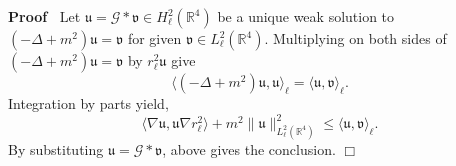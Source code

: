 \documentclass{article}
\newenvironment{proof}{\noindent\textbf{Proof\ }}{\hspace*{\fill}$\Box$\medskip}
\begin{document}
\begin{proof}
  Let $\mathfrak{u}=\mathcal{G} \ast \mathfrak{v} \in H_{\ell}^2
  (\mathbb{R}^4)$ be a unique weak solution to $(- \Delta + m^2)
  \mathfrak{u}=\mathfrak{v}$ for given $\mathfrak{v} \in L_{\ell}^2
  (\mathbb{R}^4)$.
  Multiplying on both sides of $(- \Delta + m^2) \mathfrak{u}=\mathfrak{v}$ by   $r_{\ell}^2 \mathfrak{u}$ give
  \begin{equation}
      \langle (- \Delta + m^2) \mathfrak{u}, \mathfrak{u} \rangle_{\ell} = \langle \mathfrak{u}, \mathfrak{v} \rangle_{\ell} .
  \end{equation}
  Integration by parts yield,
  \[ \langle \nabla \mathfrak{u}, \mathfrak{u} \nabla r_{\ell}^2 \rangle +
     m^2 \| \mathfrak{u} \|_{L^2_{\ell} (\mathbb{R}^4)}^2 \leqslant \langle
     \mathfrak{u}, \mathfrak{v} \rangle_{\ell} . \]
  By substituting $\mathfrak{u}=\mathcal{G} \ast \mathfrak{v}$, above gives
  the conclusion. 
\end{proof}
\end{document}

